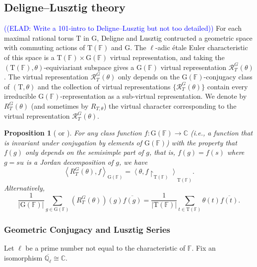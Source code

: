 \documentclass[12pt, reqno]{amsart}
\newtheorem{proposition}[theorem]{Proposition}
\theoremstyle{definition}
\theoremstyle{definition}
\theoremstyle{definition}
\newcommand{\cComplex}{\mathbb{C}}
\newcommand{\conjugate}[1]{\overline{#1}}
\newcommand{\sizeof}[1]{\left|#1\right|}
\newcommand{\innerproduct}[2]{\left\langle #1,#2\right\rangle}
\newcommand{\finiteField}{\mathbb{F}}
\newcommand{\algebraicClosure}[1]{\overline{#1}}
\newcommand{\ladicnumbers}{\algebraicClosure{\mathbb{Q}_{\ell}}}
\newcommand{\algebraicGroup}[1]{\boldsymbol{\mathrm{#1}}}
\newcommand{\RTTheta}[2]{R_{#1, #2}}
\newcommand{\RTGTheta}[3]{R_{#1}^{#2}(#3)}
\newcommand{\RTThetaVirtual}[3]{\mathcal{R}_{#1}^{#2}(#3)}
\newcommand{\elad}[1]{\textcolor{blue}{\sffamily ((ELAD: #1))}}
\begin{document}
\subsection{Deligne--Lusztig theory}
\elad{Write a 101-intro to Deligne--Lusztig but not too detailed}
For each maximal rational torus $\algebraicGroup{T}$ in $\algebraicGroup{G}$, Deligne and Lusztig contructed a geometric space with commuting actions of $\algebraicGroup{T}(\finiteField)$ and $\algebraicGroup{G}$.
The $\ell$-adic \'etale Euler characteristic of this space is a $\algebraicGroup{T}(\finiteField) \times \algebraicGroup{G}(\finiteField)$ virtual representation, and taking the $\left(\algebraicGroup{T}(\finiteField),\theta\right)$-equiviariant subspace gives a $\algebraicGroup{G}(\finiteField)$ virtual representation $\RTThetaVirtual{T}{G}{\theta}$.
The virtual representation $\RTThetaVirtual{T}{G}{\theta}$ only depends on the $\algebraicGroup{G}(\finiteField)$-conjugacy class of $(\algebraicGroup{T},\theta)$ and
the collection of virtual representations $\{\RTThetaVirtual{T}{G}{\theta}\}$ contain every irreducible $\algebraicGroup{G}(\finiteField)$-representation as a sub-virtual representation. We denote by $\RTGTheta{T}{G}{\theta}$ (and sometimes by $\RTTheta{T}{\theta}$) the virtual character corresponding to the virtual representation $\RTThetaVirtual{T}{G}{\theta}$.

\begin{proposition}[{\cite[Corollary 12.6]{DigneMichel1991} or \cite[Theorem 1.2]{SaitoShinoda2000}}]
\label{prop:semisimple_pair_with_RTtheta}
For any class function $f \colon \algebraicGroup{G}(\finiteField) \to \cComplex$ (i.e., a function that is invariant under conjugation by elements of $\algebraicGroup{G}\left(\finiteField\right)$) with the property that $f(g)$ only depends on the semisimple part of $g$, that is, $f(g) = f(s)$ where $g=su$ is a Jordan decomposition of $g$, we have
\[
	\innerproduct{\RTGTheta{T}{G}{\theta}}{f}_{\algebraicGroup{G}(\finiteField)} = \innerproduct{\theta}{f\restriction_{\algebraicGroup{T}(\finiteField)}}_{\algebraicGroup{T}(\finiteField)}.
\]
Alternatively,
\[
	\frac{1}{\sizeof{\algebraicGroup{G}(\finiteField)}}\sum_{g \in \algebraicGroup{G}(\finiteField)}\left(\RTGTheta{T}{G}{\theta}\right)(g)\conjugate{f(g)} = \frac{1}{\sizeof{\algebraicGroup{T}(\finiteField)}}\sum_{t \in  \algebraicGroup{T}(\finiteField)} \theta(t)\conjugate{f(t)}.
\]
\end{proposition}

\subsubsection{Geometric Conjugacy and Lusztig Series}
Let $\ell$ be a prime number not equal to the characteristic of $\finiteField$. Fix an isomorphism $\ladicnumbers \cong \cComplex$.
\end{document}
